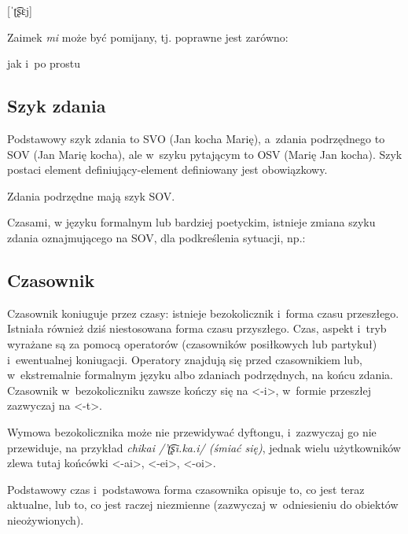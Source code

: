 \begin{spacing}{1.1}
\begin{multicols}{2}
[ˈʈ͡ʂɛj]

\end{multicols}

\noindent
Zaimek \emph{mi} może być pomijany, tj. poprawne jest zarówno: 


\noindent
jak i~po prostu


\subsection{Szyk zdania}

Podstawowy szyk zdania to SVO (Jan kocha Marię), a~zdania podrzędnego to SOV
(Jan Marię kocha), ale w~szyku pytającym to OSV (Marię Jan kocha). Szyk postaci
element definiujący-element definiowany jest obowiązkowy.

Zdania podrzędne mają szyk SOV.

Czasami, w języku formalnym lub bardziej poetyckim, istnieje zmiana szyku zdania
oznajmującego na SOV, dla podkreślenia sytuacji, np.:


\subsection{Czasownik}

Czasownik koniuguje przez czasy: istnieje bezokolicznik i~forma czasu
przeszłego. Istniała również dziś niestosowana forma czasu przyszłego. Czas,
aspekt i~tryb wyrażane są za pomocą operatorów (czasowników posiłkowych lub
partykuł) i~ewentualnej koniugacji. Operatory znajdują się przed czasownikiem
lub, w~ekstremalnie formalnym języku albo zdaniach podrzędnych, na końcu zdania.
Czasownik w~bezokoliczniku zawsze kończy się na <-i>, w~formie przeszłej
zazwyczaj na <-t>.

Wymowa bezokolicznika może nie przewidywać dyftongu, i~zazwyczaj go nie
przewiduje, na przykład \emph{chikai /'ʈ͡ʂi.ka.i/ (śmiać się)}, jednak wielu
użytkowników zlewa tutaj końcówki <-ai>, <-ei>, <-oi>.

\skipline

Podstawowy czas i~podstawowa forma czasownika opisuje to, co jest teraz
aktualne, lub to, co jest raczej niezmienne (zazwyczaj w~odniesieniu do obiektów
nieożywionych).


\end{spacing}
